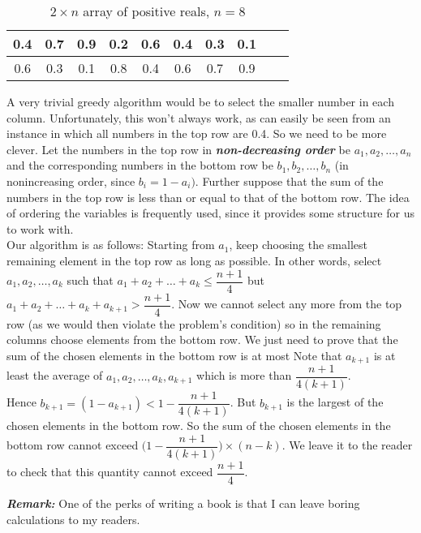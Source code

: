 \documentclass[a4paper,11pt]{book}
\begin{document}
\begin{center}
\begin{table}[h!]
\centering
\begin{tabular}{ |c|c|c|c|c|c|c|c| c|c|} 
\hline
0.4 & 0.7 & 0.9 & 0.2 & 0.6 & 0.4 & 0.3 & 0.1 \\
\hline
0.6 & 0.3 & 0.1 & 0.8 & 0.4 & 0.6 & 0.7 & 0.9 \\
\hline
\end{tabular}
\caption{$2\times n$ array of positive reals, $n=8$}
\end{table}
\end{center}
\begin{soln}
A very trivial greedy algorithm would be to select the smaller
number in each column. Unfortunately, this won’t always work, as can easily be seen from an instance in which all numbers in the top row are 0.4. So we need to be more clever. Let the numbers in the top row in \textbf{\textit{non-decreasing order}}  be $a_1, a_2, \dots, a_n$ and the corresponding numbers in the bottom row be $b_1, b_2, \dots, b_n$ (in nonincreasing order, since $b_{i} = 1 - a_i)$. Further suppose that the sum of the numbers in the top row is less than or equal to that of the bottom row. The idea of ordering the variables is frequently used, since it provides some structure for us to work with.\\

Our algorithm is as follows: Starting from $a_1$, keep choosing the smallest remaining element in the top row as long as possible. In other words, select $a_1, a_2, \dots, a_k$ such that $a_1 + a_2 + \dots + a_k \le \dfrac{n+1}{4}$ but $a_1 + a_2 + \dots + a_k + a_{k+1} > \dfrac{n+1}{4}$. Now we cannot select any more from the top row (as we would then violate the problem’s condition) so in the remaining columns choose elements from the bottom row. We just need to prove that the sum of the chosen elements in the bottom row is at most Note that $a_{k+1}$ is at least the average of $a_1, a_2, \dots, a_k, a_{k+1}$ which is more than $\dfrac{n+1}{4(k+1)}$.\\

Hence $b_{k+1} = (1 - a_{k+1}) < 1-\dfrac{n+1}{4(k+1)}$. But $b_{k+1}$ is the largest of the chosen elements in the bottom row. So the sum of the chosen elements in the bottom row cannot exceed $\Bigg(1 -\dfrac{n+1}{4(k+1)} \Bigg) \times (n-k)$. We leave it to the reader to check that this quantity cannot exceed $\dfrac{n+1}{4}$.
\end{soln}
\textit{\textbf{Remark:}} One of the perks of writing a book is that I can leave boring calculations to my readers.
\end{document}
